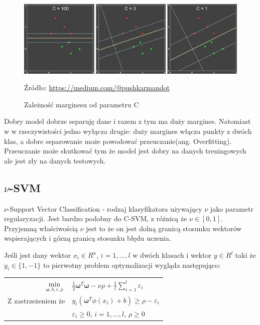 \documentclass[paper=a4, fontsize=11pt]{scrartcl} %
\numberwithin{equation}{section} %
\numberwithin{figure}{section} %
\newcommand*{\captionsource}[2]{%
  \caption[{#1}]{%
      #1}
    Źródło: #2%
}
\begin{document}
    \begin{figure}[h]
        \begin{center}
            \includegraphics[scale=0.8]{./img/param_c.png}
            \captionsource{Zależność marginesu od parametru C}{\url{https://medium.com/@pushkarmandot}}
            \label{fig:param_c}
        \end{center}
    \end{figure}

    \par Dobry model dobrze separuję dane i razem z tym ma duży margines. Natomiast w
    w rzeczywistości jedno wyłącza drugie: duży margines włącza punkty z dwóch klas, a
    dobre separowanie może powodować przeuczanie(ang. Overfitting). Przeuczanie może 
    skutkować tym że model jest dobry na danych treningowych ale jest zły na danych testowych.

\newpage %
\subsection{$\nu$-SVM}
    \par $\nu$-Support Vector Classification - rodzaj klasyfikatora używający $\nu$ jako
    parametr regularyzacji. Jest bardzo podobny do C-SVM, z różnicą że $\nu\in[0,1]$.
    Przyjemną właściwością $\nu$ jest to że on jest dolną granicą stosunku wektorów
    wspierających i górną granicą stosunku błędu uczenia.
    \par Jeśli jest dany wektor $x_i \in R^n$, $i=1,...,l$ w dwóch klasach i wektor
    $y\in R^l$ taki że $y_i \in \{1, -1\}$ to pierwotny problem optymalizacji wygląda
    następująco:

    \begin{center}
        \begin{tabular}{rl}
            $\min\limits_{\pmb{\omega},b,\varepsilon, \rho}$ &
            $\frac{1}{2}\pmb{\omega}^T\pmb{\omega} - \nu\rho + \frac{1}{l}\sum\limits_{i=1}^{l}
            \varepsilon_i$ \\
            Z zastrzeżeniem że & $y_i(\pmb{\omega}^T\phi(x_i) + b) \geq \rho - \varepsilon_i$ \\
                               & $\varepsilon_i \geq 0$, $i=1,...,l$, $\rho \geq 0$
        \end{tabular}
    \end{center}
\end{document}
